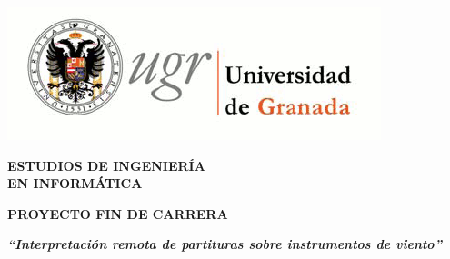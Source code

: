 
 \setcounter{page}{1}

\thispagestyle{empty}
%

\newpage

\thispagestyle{empty}

\begin{center}
\textbf{\huge \includegraphics[scale=0.8]{logo_ugr.png}}
\par\end{center}{\huge \par}

\begin{center}
\vspace*{1cm} 
\par\end{center}

\begin{center}
\textbf{\large ESTUDIOS DE INGENIERÍA }\\
\textbf{\large EN INFORMÁTICA}
\par\end{center}{\large \par}

\begin{center}
\textbf{\large PROYECTO FIN DE CARRERA}
\par\end{center}{\large \par}

\begin{center}

\par\end{center}

\begin{center}
\textbf{\emph{\LARGE {}``Interpretación remota de partituras sobre instrumentos de viento''}}
\par\end{center}{\LARGE \par}

